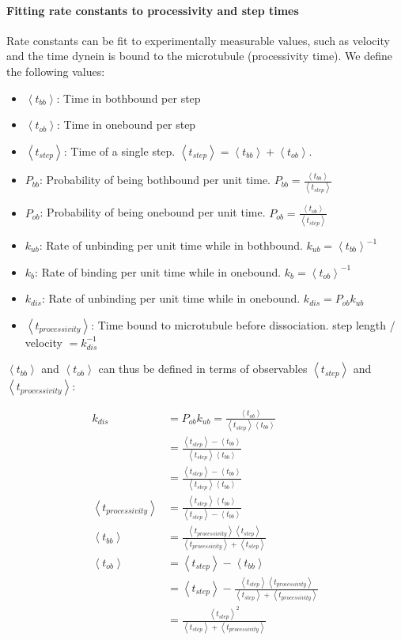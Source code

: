\documentclass[10pt]{article} %
\begin{document}
\paragraph{Fitting rate constants to processivity and step times}
Rate constants can be fit to experimentally measurable values, such as velocity and the time dynein is bound to the microtubule (processivity time). We define the following values:

\newcommand\tbb{\left<t_{bb}\right>}
\newcommand\tob{\left<t_{ob}\right>}
\newcommand\tstep{\left<t_{step}\right>}
\newcommand\tproc{\left<t_{processivity}\right>}
\newcommand\kub{k_{ub}}
\newcommand\kb{k_{b}}
\newcommand\ko{k_{dis}}

\begin{itemize}
\item $\tbb$: Time in bothbound per step
\item $\tob$: Time in onebound per step
\item $\tstep$: Time of a single step. $\tstep=\tbb+\tob$.
\item $P_{bb}$: Probability of being bothbound per unit time. $P_{bb} = \frac{\tbb}{\tstep}$
\item $P_{ob}$: Probability of being onebound per unit time. $P_{ob} = \frac{\tob}{\tstep}$
\item $\kub$: Rate of unbinding per unit time while in bothbound. $\kub = \tbb^{-1}$
\item $\kb$: Rate of binding per unit time while in onebound. $\kb = \tob^{-1}$
\item $\ko$: Rate of unbinding per unit time while in onebound. $\ko = P_{ob}\kub$
\item $\tproc$: Time bound to microtubule before dissociation. step length / velocity $= \ko^{-1}$
\end{itemize}

$\tbb$ and $\tob$ can thus be defined in terms of observables $\tstep$ and $\tproc$:

\begin{align*}
  \ko &= P_{ob}\kub = \frac{\tob}{\tstep\tbb}\\
  &= \frac{\tstep-\tbb}{\tstep\tbb}\\
  &= \frac{\tstep-\tbb}{\tstep\tbb}\\
  \tproc &= \frac{\tstep\tbb}{\tstep-\tbb}\\
  \tbb &= \frac{\tproc\tstep}{\tproc+\tstep}\\
  \tob &= \tstep-\tbb\\
  &= \tstep - \frac{\tstep\tproc}{\tstep+\tproc}\\
  &= \frac{\tstep^2}{\tstep+\tproc}\\
\end{align*}
\end{document}
